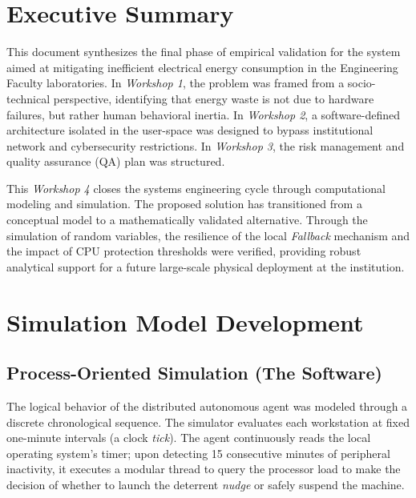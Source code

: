 \documentclass[12pt,a4paper]{article}
\begin{document}
\newpage
\tableofcontents
\newpage
\listoffigures
\newpage
\listoftables
\newpage


\section{Executive Summary}
This document synthesizes the final phase of empirical validation for the system aimed at mitigating inefficient electrical energy consumption in the Engineering Faculty laboratories. In \textit{Workshop 1}, the problem was framed from a socio-technical perspective, identifying that energy waste is not due to hardware failures, but rather human behavioral inertia. In \textit{Workshop 2}, a software-defined architecture isolated in the user-space was designed to bypass institutional network and cybersecurity restrictions. In \textit{Workshop 3}, the risk management and quality assurance (QA) plan was structured. 

This \textit{Workshop 4} closes the systems engineering cycle through computational modeling and simulation. The proposed solution has transitioned from a conceptual model to a mathematically validated alternative. Through the simulation of random variables, the resilience of the local \textit{Fallback} mechanism and the impact of CPU protection thresholds were verified, providing robust analytical support for a future large-scale physical deployment at the institution.

\section{Simulation Model Development}

\subsection{Process-Oriented Simulation (The Software)}
The logical behavior of the distributed autonomous agent was modeled through a discrete chronological sequence. The simulator evaluates each workstation at fixed one-minute intervals (a clock \textit{tick}). The agent continuously reads the local operating system's timer; upon detecting 15 consecutive minutes of peripheral inactivity, it executes a modular thread to query the processor load to make the decision of whether to launch the deterrent \textit{nudge} or safely suspend the machine.
\end{document}
